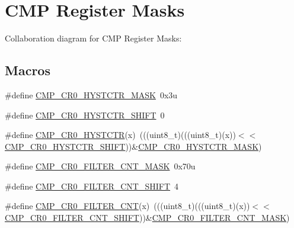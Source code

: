 \hypertarget{group___c_m_p___register___masks}{}\section{C\+MP Register Masks}
\label{group___c_m_p___register___masks}
Collaboration diagram for C\+MP Register Masks\+:
\subsection*{Macros}
\begin{DoxyCompactItemize}
\item 
\#define \hyperlink{group___c_m_p___register___masks_ga9a81a95d8ceda15abb107f3c961e2f03}{C\+M\+P\+\_\+\+C\+R0\+\_\+\+H\+Y\+S\+T\+C\+T\+R\+\_\+\+M\+A\+SK}~0x3u
\item 
\#define \hyperlink{group___c_m_p___register___masks_ga12a965eae39b79d9e6066de9af418df3}{C\+M\+P\+\_\+\+C\+R0\+\_\+\+H\+Y\+S\+T\+C\+T\+R\+\_\+\+S\+H\+I\+FT}~0
\item 
\#define \hyperlink{group___c_m_p___register___masks_ga78eaf28aa2956818501310daaeffca74}{C\+M\+P\+\_\+\+C\+R0\+\_\+\+H\+Y\+S\+T\+C\+TR}(x)~(((uint8\+\_\+t)(((uint8\+\_\+t)(x))$<$$<$\hyperlink{group___c_m_p___register___masks_ga12a965eae39b79d9e6066de9af418df3}{C\+M\+P\+\_\+\+C\+R0\+\_\+\+H\+Y\+S\+T\+C\+T\+R\+\_\+\+S\+H\+I\+FT}))\&\hyperlink{group___c_m_p___register___masks_ga9a81a95d8ceda15abb107f3c961e2f03}{C\+M\+P\+\_\+\+C\+R0\+\_\+\+H\+Y\+S\+T\+C\+T\+R\+\_\+\+M\+A\+SK})
\item 
\#define \hyperlink{group___c_m_p___register___masks_gab1e98c122818fe880217f72fab932ac2}{C\+M\+P\+\_\+\+C\+R0\+\_\+\+F\+I\+L\+T\+E\+R\+\_\+\+C\+N\+T\+\_\+\+M\+A\+SK}~0x70u
\item 
\#define \hyperlink{group___c_m_p___register___masks_ga07a4d57ab7d44b55b3d73f612aa7dd98}{C\+M\+P\+\_\+\+C\+R0\+\_\+\+F\+I\+L\+T\+E\+R\+\_\+\+C\+N\+T\+\_\+\+S\+H\+I\+FT}~4
\item 
\#define \hyperlink{group___c_m_p___register___masks_ga1f6d81f303672acd661263de6da7ea13}{C\+M\+P\+\_\+\+C\+R0\+\_\+\+F\+I\+L\+T\+E\+R\+\_\+\+C\+NT}(x)~(((uint8\+\_\+t)(((uint8\+\_\+t)(x))$<$$<$\hyperlink{group___c_m_p___register___masks_ga07a4d57ab7d44b55b3d73f612aa7dd98}{C\+M\+P\+\_\+\+C\+R0\+\_\+\+F\+I\+L\+T\+E\+R\+\_\+\+C\+N\+T\+\_\+\+S\+H\+I\+FT}))\&\hyperlink{group___c_m_p___register___masks_gab1e98c122818fe880217f72fab932ac2}{C\+M\+P\+\_\+\+C\+R0\+\_\+\+F\+I\+L\+T\+E\+R\+\_\+\+C\+N\+T\+\_\+\+M\+A\+SK})
\item 

\end{DoxyCompactItemize}
